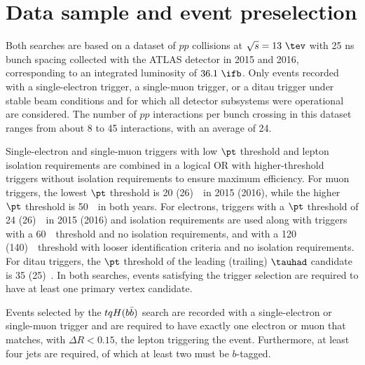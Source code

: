 \section{Data sample and event preselection}
\label{sec:data_presel}

Both searches are based on a dataset of $pp$ collisions at $\sqrt{s}=13~\tev$ with 25 ns bunch spacing collected 
with the ATLAS detector in 2015 and 2016, corresponding to an integrated luminosity of $36.1~\ifb$.
Only events recorded with a single-electron trigger, a single-muon trigger, or a ditau trigger under stable beam conditions 
and for which all detector subsystems were operational are considered.
The number of $pp$ interactions per bunch crossing in this dataset ranges from about 8 to 45 interactions, with an average of 24.

Single-electron and single-muon triggers with low $\pt$ threshold and lepton isolation requirements are combined in a logical OR 
with higher-threshold triggers without isolation requirements to ensure maximum efficiency. 
For muon triggers, the lowest $\pt$ threshold is 20 (26)~\gev\ in 2015 (2016), while the higher $\pt$ threshold is 50~\gev\ in both years. 
For electrons, triggers with a $\pt$ threshold of 24 (26)~\gev\ in 2015 (2016) and isolation requirements are used
along with triggers with a 60~\gev\ threshold and no isolation requirements, and with a 120 (140)~\gev\ threshold 
with looser identification criteria and no isolation requirements.
For ditau triggers, the $\pt$ threshold of the leading (trailing) $\tauhad$ candidate is 35 (25)~\gev.
In both searches, events satisfying the trigger selection are required to have at least one primary vertex candidate.

Events selected by the $tqH(b\bar{b})$ search are recorded with a single-electron or single-muon trigger and 
are required to have exactly one electron or muon that matches, with $\Delta R < 0.15$, the lepton triggering the event.  
Furthermore, at least four jets are required, of which at least two must be $b$-tagged.

